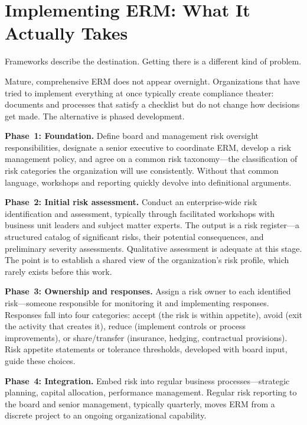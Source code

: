 \documentclass[11pt,openany]{book}
\begin{document}
\section{Implementing ERM: What It Actually Takes}
\label{sec:erm-implementation}

Frameworks describe the destination. Getting there is a different kind of problem.

Mature, comprehensive ERM does not appear overnight. Organizations that have tried to implement everything at once typically create compliance theater: documents and processes that satisfy a checklist but do not change how decisions get made. The alternative is phased development.

\textbf{Phase~1: Foundation.} Define board and management risk oversight responsibilities, designate a senior executive to coordinate ERM, develop a risk management policy, and agree on a common risk taxonomy---the classification of risk categories the organization will use consistently. Without that common language, workshops and reporting quickly devolve into definitional arguments.

\textbf{Phase~2: Initial risk assessment.} Conduct an enterprise-wide risk identification and assessment, typically through facilitated workshops with business unit leaders and subject matter experts. The output is a risk register---a structured catalog of significant risks, their potential consequences, and preliminary severity assessments. Qualitative assessment is adequate at this stage. The point is to establish a shared view of the organization's risk profile, which rarely exists before this work.

\textbf{Phase~3: Ownership and responses.} Assign a risk owner to each identified risk---someone responsible for monitoring it and implementing responses. Responses fall into four categories: accept (the risk is within appetite), avoid (exit the activity that creates it), reduce (implement controls or process improvements), or share/transfer (insurance, hedging, contractual provisions). Risk appetite statements or tolerance thresholds, developed with board input, guide these choices.

\textbf{Phase~4: Integration.} Embed risk into regular business processes---strategic planning, capital allocation, performance management. Regular risk reporting to the board and senior management, typically quarterly, moves ERM from a discrete project to an ongoing organizational capability.
\end{document}
